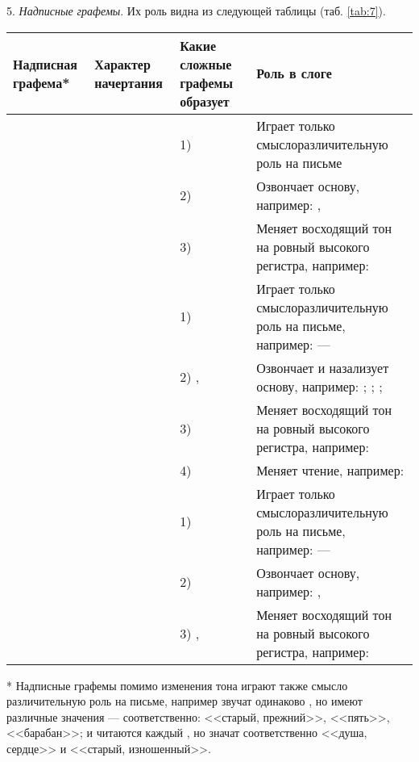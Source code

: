 5. \emph{Надписные графемы}. Их роль видна из следующей таблицы (таб. \ref{tab:7}).

\begin{tabularx}{\textwidth}{p{}p{}p{}p{}}
	\caption{Надписные графемы}\label{tab:7}\\
	\toprule
	\parbox[t]{0.1\textwidth}{\small\centering Над\-пис\-ная графема*} & \parbox[t]{0.1\textwidth}{\small\centering Характер начертания} & \parbox[t]{0.25\textwidth}{\small\centering Какие сложные графемы образует} & \parbox[t]{0.45\textwidth}{\small\centering Роль в слоге}\\
	\midrule
	\endhead
	 &  & 1)    & Играет только смыслоразличительную роль на письме\\
	& & 2)      & Озвончает основу, например: , \\
	& & 3)     & Меняет восходящий тон на ровный высокого регистра, например: \\
	\addlinespace
	 &  & 1)     & Играет только смыслоразличительную роль на письме, например:  --- \\
	& & 2)   ,  & Озвончает и назализует основу, например: ; ; ; \\
	& & 3)  & Меняет восходящий тон на ровный высокого регистра, например: \\
	& & 4)  & Меняет чтение, например: \\
	\addlinespace
	 &  & 1)     & Играет только смыслоразличительную роль на письме, например:  --- \\
	& & 2)    & Озвончает основу, например: , \\
	& & 3)   ,  & Меняет восходящий тон на ровный высокого регистра, например: \\
	\bottomrule
\end{tabularx}
{\footnotesize{* Надписные графемы    помимо изменения тона играют также смысло различительную роль на письме, например    звучат одинаково , но имеют различные значения --- соответственно: <<старый, прежний>>, <<пять>>, <<барабан>>;  и  читаются каждый , но значат соответственно <<душа, сердце>> и <<старый, изношенный>>.}}

